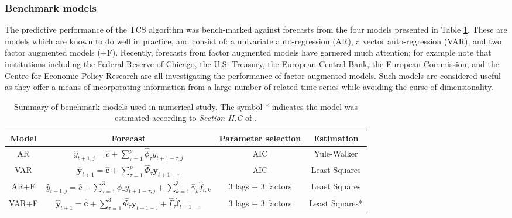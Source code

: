\documentclass[11pt]{report}\usepackage[utf8]{inputenc}
\begin{document}
\subsubsection{Benchmark models}

The predictive performance of the TCS algorithm was bench-marked against forecasts from the four models presented in Table \ref{benchmark models}. These are models which are known to do well in practice, and consist of: a univariate auto-regression (AR), a vector auto-regression (VAR), and two factor augmented models (+F). Recently, forecasts from factor augmented models have garnered much attention; \cite{boivin2005understanding} for example note that institutions including the Federal Reserve of Chicago, the U.S. Treasury, the European Central Bank, the European Commission, and the Centre for Economic Policy Research are all investigating the performance of factor augmented models. Such models are considered useful as they offer a means of incorporating information from a large number of related time series while avoiding the curse of dimensionality. 

\begin{table}[h]
    \centering
    \bgroup
    \def\arraystretch{1.5}
    \begin{tabular}{c|c|c|c}
    \cmidrule(r){1-4}
    Model & Forecast & Parameter selection & Estimation \\
    \hline
    AR & $\widehat{y}_{t+1,j} = \widehat{c} + \sum_{\tau=1}^{p} \widehat{\phi}_\tau y_{t+1-\tau,j}$ & AIC & Yule-Walker \\
    VAR & $\widehat{\boldsymbol{y}}_{t+1} = \widehat{\boldsymbol{c}} + \sum_{\tau = 1}^{p} \widehat{\Phi}_\tau \boldsymbol{y}_{t+1-\tau}$ & AIC & Least Squares \\
    AR+F & $\widehat{y}_{t+1,j} = \widehat{c} + \sum_{\tau=1}^{3} \widehat{\phi}_\tau y_{t+1-\tau,j} + \sum_{k=1}^{3} \widehat{\gamma}_k \widehat{f}_{t,k}$ & 3 lags + 3 factors & Least Squares \\
    VAR+F & $\widehat{\boldsymbol{y}}_{t+1} = \widehat{\boldsymbol{c}} + \sum_{\tau = 1}^{3} \widehat{\Phi}_\tau \boldsymbol{y}_{t+1-\tau} + \widehat{\Gamma}_\tau \widehat{\boldsymbol{f}}_{t+1-\tau}$ & 3 lags + 3 factors & Least Squares*
    \end{tabular}
    \egroup
    \caption{Summary of benchmark models used in numerical study. The symbol * indicates the model was estimated according to \textit{Section II.C} of \cite{bernanke2005measuring}.}
    \label{benchmark models}
\end{table}
\end{document}
